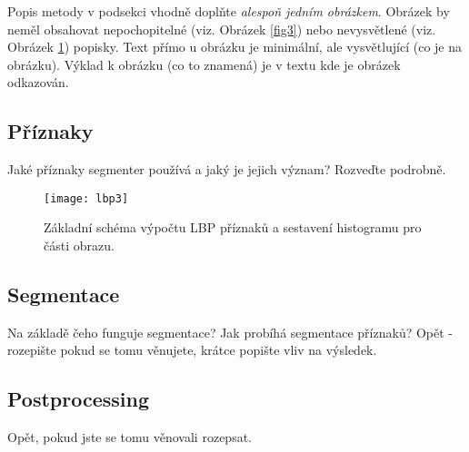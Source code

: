 \documentclass[a4paper,10pt,twocolumn]{article}
\begin{document}
Popis metody v podsekci vhodně doplňte \emph{alespoň jedním obrázkem}. Obrázek by neměl obsahovat nepochopitelné (viz. Obrázek \ref{fig3}) nebo nevysvětlené (viz. Obrázek \ref{fig2}) popisky. Text přímo u obrázku je minimální, ale vysvětlující (co je na obrázku). Výklad k obrázku (co to znamená) je v textu kde je obrázek odkazován.


\subsection{Příznaky}

Jaké příznaky segmenter používá a jaký je jejich význam? Rozveďte podrobně.

\begin{figure}[H]
      \begin{center}
            \texttt{[image: lbp3]}
      \end{center}
      \caption{Základní schéma výpočtu LBP příznaků a sestavení histogramu pro části obrazu.}
      \label{fig2}
\end{figure}




\subsection{Segmentace}
Na základě čeho funguje segmentace? Jak probíhá segmentace příznaků? Opět - rozepište pokud se tomu věnujete, krátce popište vliv na výsledek.


\subsection{Postprocessing}
Opět, pokud jste se tomu věnovali rozepsat. 
\end{document}
